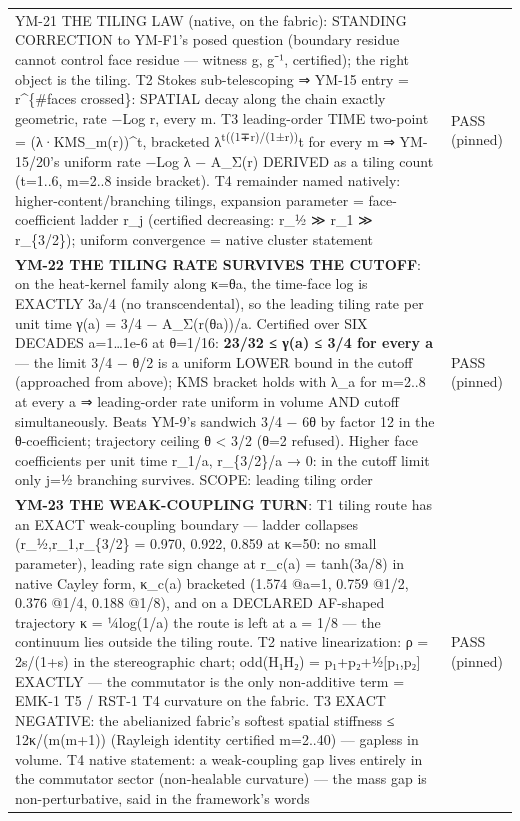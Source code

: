 \begin{longtable}[]{@{}
  >{\raggedright\arraybackslash}p{}
  >{\raggedright\arraybackslash}p{}@{}}
YM-21 THE TILING LAW (native, on the fabric): STANDING CORRECTION to YM-F1's posed question (boundary residue cannot control face residue --- witness g, g⁻¹, certified); the right object is the tiling. T2 Stokes sub-telescoping ⇒ YM-15 entry = r\^{}\{\#faces crossed\}: SPATIAL decay along the chain exactly geometric, rate −Log r, every m. T3 leading-order TIME two-point = (λ·KMS\_m(r))\^{}t, bracketed λ\textsuperscript{t((1∓r)/(1±r))}t for every m ⇒ YM-15/20's uniform rate −Log λ − A\_Σ(r) DERIVED as a tiling count (t=1..6, m=2..8 inside bracket). T4 remainder named natively: higher-content/branching tilings, expansion parameter = face-coefficient ladder r\_j (certified decreasing: r\_½ ≫ r\_1 ≫ r\_\{3/2\}); uniform convergence = native cluster statement & PASS (pinned) \\
\textbf{YM-22 THE TILING RATE SURVIVES THE CUTOFF}: on the heat-kernel family along κ=θa, the time-face log is EXACTLY 3a/4 (no transcendental), so the leading tiling rate per unit time γ(a) = 3/4 − A\_Σ(r(θa))/a. Certified over SIX DECADES a=1\ldots1e-6 at θ=1/16: \textbf{23/32 ≤ γ(a) ≤ 3/4 for every a} --- the limit 3/4 − θ/2 is a uniform LOWER bound in the cutoff (approached from above); KMS bracket holds with λ\_a for m=2..8 at every a ⇒ leading-order rate uniform in volume AND cutoff simultaneously. Beats YM-9's sandwich 3/4 − 6θ by factor 12 in the θ-coefficient; trajectory ceiling θ \textless{} 3/2 (θ=2 refused). Higher face coefficients per unit time r\_1/a, r\_\{3/2\}/a → 0: in the cutoff limit only j=½ branching survives. SCOPE: leading tiling order & PASS (pinned) \\
\textbf{YM-23 THE WEAK-COUPLING TURN}: T1 tiling route has an EXACT weak-coupling boundary --- ladder collapses (r\_½,r\_1,r\_\{3/2\} = 0.970, 0.922, 0.859 at κ=50: no small parameter), leading rate sign change at r\_c(a) = tanh(3a/8) in native Cayley form, κ\_c(a) bracketed (1.574 @a=1, 0.759 @1/2, 0.376 @1/4, 0.188 @1/8), and on a DECLARED AF-shaped trajectory κ = ¼log(1/a) the route is left at a = 1/8 --- the continuum lies outside the tiling route. T2 native linearization: ρ = 2s/(1+s) in the stereographic chart; odd(H₁H₂) = p₁+p₂+½{[}p₁,p₂{]} EXACTLY --- the commutator is the only non-additive term = EMK-1 T5 / RST-1 T4 curvature on the fabric. T3 EXACT NEGATIVE: the abelianized fabric's softest spatial stiffness ≤ 12κ/(m(m+1)) (Rayleigh identity certified m=2..40) --- gapless in volume. T4 native statement: a weak-coupling gap lives entirely in the commutator sector (non-healable curvature) --- the mass gap is non-perturbative, said in the framework's words & PASS (pinned) \\

\end{longtable}
